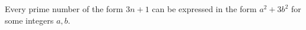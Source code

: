 Every prime number of the form $3n + 1$ can be expressed in the form $a^2 + 3b^2$ for some integers $a, b$.
